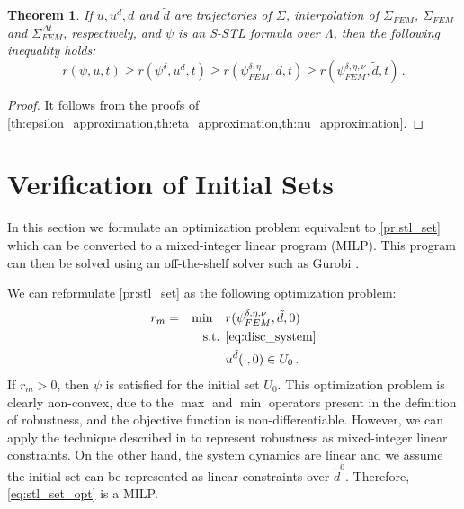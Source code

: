 \documentclass[letterpaper, 10 pt, conference]{ieeeconf/ieeeconf}
\newtheorem{theorem}{Theorem}
\begin{document}
\begin{theorem}
    \label{th:robustness}
    If $u, u^d, d$ and $\tilde{d}$ are trajectories of $\Sigma$, interpolation
    of $\Sigma_{FEM}$, $\Sigma_{FEM}$ and $\Sigma_{FEM}^{\Delta t}$,
    respectively, and $\psi$ is an S-STL formula over $\Lambda$, then the 
    following inequality holds:
    \begin{equation}
        r(\psi, u, t) \geq r(\psi^{\delta}, u^d, t) \geq r(\psi^{\delta,
        \eta}_{FEM}, d, t) \geq r(\psi^{\delta, \eta, \nu}_{FEM}, \tilde{d}, t)
        \,.
    \end{equation}
\end{theorem}
\begin{proof}
    It follows from the proofs of
    \cref{th:epsilon_approximation,th:eta_approximation,th:nu_approximation}.
\end{proof}

\section{Verification of Initial Sets}
\label{sec:verification_of_initial_sets}

In this section we formulate an optimization problem equivalent to
\cref{pr:stl_set} which can be converted to a mixed-integer linear program
(MILP). This program can then be solved using an off-the-shelf solver such 
as Gurobi \cite{gurobi}.

We can reformulate \cref{pr:stl_set} as the following optimization problem:
%
\begin{equation}
    \label{eq:stl_set_opt}
    \begin{aligned}
        &r_m = &\min \quad &r(\psi^{\delta, \eta, \nu}_{FEM}, \tilde{d}, 0) \\
        &  &\text{s.t. } &\cref{eq:disc_system} \\
        &  & &u^{\tilde{d}}(\cdot, 0) \in U_0 \,.
    \end{aligned}
\end{equation}
%
If $r_m > 0$, then $\psi$ is satisfied for the initial set $U_0$. This
optimization problem is clearly non-convex, due to the $\max$ and $\min$
operators present in the definition of robustness, and the objective function is
non-differentiable. However, we can apply the technique described in
\cite{sadraddini_robust_2015} to
represent robustness as mixed-integer linear constraints. On the other hand, the
system dynamics are linear and we assume the initial set can be represented as
linear constraints over $\tilde{d}^0$. Therefore, \cref{eq:stl_set_opt} is a
MILP.
\end{document}
